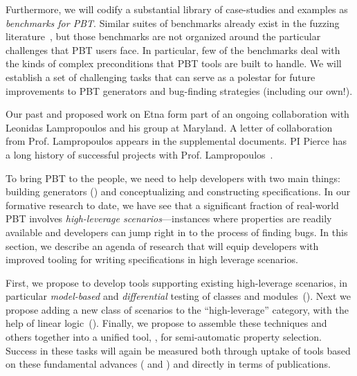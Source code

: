 Furthermore, we will codify a substantial library of case-studies and examples as
{\em benchmarks for PBT}. Similar suites of benchmarks already exist in the
fuzzing literature~\cite{hazimeh_magma_2021}, but those benchmarks are not
organized around the particular challenges that PBT users face. In particular,
few of the benchmarks deal with the kinds of complex preconditions that PBT
tools are built to handle. We will establish a set of challenging tasks that
can serve as a polestar for future improvements to PBT generators and
bug-finding strategies (including our own!).

Our past and proposed work on Etna form part of an ongoing
collaboration with Leonidas Lampropoulos and his group at Maryland.
A letter of collaboration
from Prof.{} Lampropoulos appears in the supplemental documents.
PI Pierce has a long history
of successful projects with Prof.
Lampropoulos~\cite[etc.]{beginners-luck,DBLP:conf/esop/GoldsteinHLP21,lampropoulos_coverage_2019,Lampropoulos&18,OLDlampropoulos19fuzzchick}.


%
To bring PBT to the people, we need to help developers with two main
things: building generators () and conceptualizing and constructing
specifications.
%
In our formative research to date, we have
see that a significant fraction of real-world PBT
involves {\em high-leverage scenarios}---instances where properties are
readily available and developers can jump right in to the process of finding
bugs.
%
In this section, we describe an agenda of research that will equip developers
with improved tooling for writing
specifications in high leverage scenarios.

First, we
propose to develop tools
supporting existing high-leverage scenarios, in particular {\em
model-based} and {\em differential} testing of classes and
modules~(). Next we propose
adding a new class of scenarios to the ``high-leverage'' category, with the
help of linear logic~(). Finally, we propose
to assemble these
techniques and others together into a unified tool, {\em \GhostChat}, for
semi-automatic property selection.
%
Success in these tasks will again be measured both through
uptake of
tools based on these fundamental advances ( and
) and directly in terms of publications.

